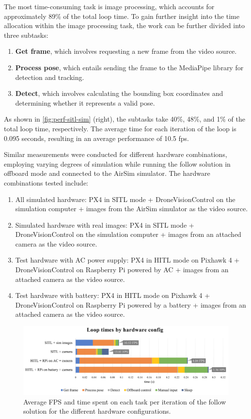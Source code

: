 The most time-consuming task is image processing, which accounts for approximately 89\% of the total loop time. To gain further insight into the time allocation within the image processing task, the work can be further divided into three subtasks:
\begin{enumerate}
    \item \textbf{Get frame}, which involves requesting a new frame from the video source.
    \item \textbf{Process pose}, which entails sending the frame to the MediaPipe library for detection and tracking.
    \item \textbf{Detect}, which involves calculating the bounding box coordinates and determining whether it represents a valid pose.
\end{enumerate}

As shown in \ref{fig:perf-sitl-sim} (right), the subtasks take 40\%, 48\%, and 1\% of the total loop time, respectively. The average time for each iteration of the loop is 0.095 seconds, resulting in an average performance of 10.5 \acrfull{fps}.

Similar measurements were conducted for different hardware combinations, employing varying degrees of simulation while running the follow solution in offboard mode and connected to the AirSim simulator. The hardware combinations tested include:
\begin{enumerate}
    \item All simulated hardware: PX4 in SITL mode + DroneVisionControl on the simulation computer + images from the AirSim simulator as the video source.
    \item Simulated hardware with real images: PX4 in SITL mode + DroneVisionControl on the simulation computer + images from an attached camera as the video source.
    \item Test hardware with AC power supply: PX4 in HITL mode on Pixhawk 4 + DroneVisionControl on Raspberry Pi powered by AC + images from an attached camera as the video source.
    \item Test hardware with battery: PX4 in HITL mode on Pixhawk 4 + DroneVisionControl on Raspberry Pi powered by a battery + images from an attached camera as the video source.
\end{enumerate}


\begin{figure}[H]
  \centering
  \includegraphics[width=\textwidth, keepaspectratio]{img/performance-graph.png}
  \caption{Average FPS and time spent on each task per iteration of the follow solution for the different hardware configurations.}
  \label{fig:perf-analysis}
\end{figure}


